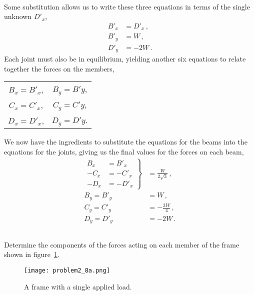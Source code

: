 \documentclass[a4paper,justified,oneside]{tufte-handout}
\numberwithin{equation}{subsection}
\begin{document}
\begin{solution}
\begin{align*}
\end{align*}
Some substitution allows us to write these three equations in terms of the single unknown $D'_x$,
\begin{align*}
	B'_x	&=	D'_x	\,,\\
	B'_y	&=	W	\,,	\\
	D'_y	&=	-2W	\,.
\end{align*}
Each joint must also be in equilibrium, yielding another six equations to relate together the forces on the members,
\begin{center}
	\begin{tabular}{cc}
		{$B_x	=	B'_x$,}	&	{$B_y	=	B'y$,}	\\
		{$C_x	=	C'_x$,}	&	{$C_y	=	C'y$,}	\\
		{$D_x	=	D'_x$,}	&	{$D_y	=	D'y$.}
	\end{tabular}
\end{center}
We now have the ingredients to substitute the equations for the beams into the equations for the joints, giving us the final values for the forces on each beam,
\begin{align*}
	\left.\begin{aligned}
		B_x		&=B'_x	\\
		-C_x	&=-C'_x	\\
		-D_x	&=	-D'_x	
	\end{aligned}\right\}	&=	\frac{W}{2\sqrt{3}}	\,,	\\
	B_y	=B'_y	\;\;\:\quad		&=	W	\,,	\\
	C_y	=C'_y	\;\;\;\quad		&=	-\frac{3W}{4}	\,,	\\
	D_y	=D'_y	\;\;\:\quad			&=	-2W	\,.
\end{align*}
\clearpage
\end{solution}

\subsection{}\label{A3:sec:frame2}
Determine the components of the forces acting on each member of the frame shown in figure~\ref{A3:fig:Q8a}.
\begin{figure}
	\centering
	\texttt{[image: problem2\_8a.png]}
	\caption{A frame with a single applied load.}
	\label{A3:fig:Q8a}
\end{figure}
\end{document}
